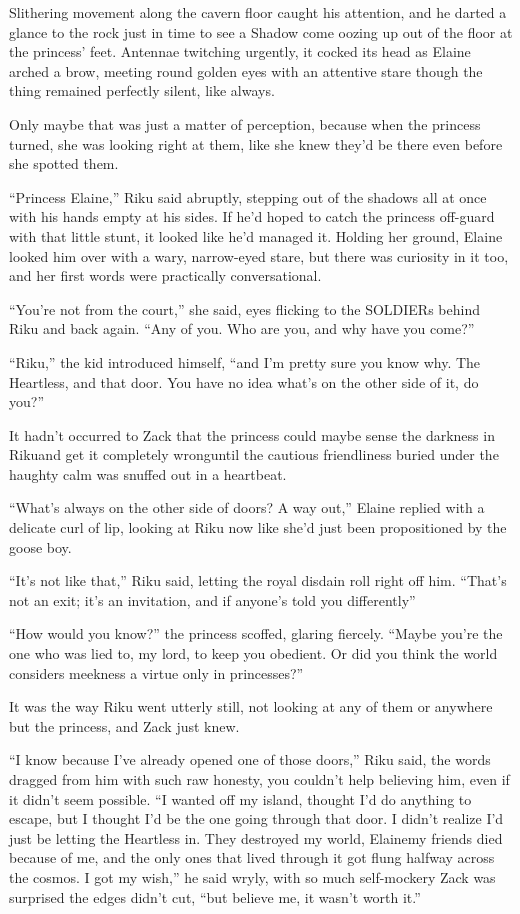 Slithering movement along the cavern floor caught his attention, and he darted a glance to the rock just in time to see a Shadow come oozing up out of the floor at the princess' feet. Antennae twitching urgently, it cocked its head as Elaine arched a brow, meeting round golden eyes with an attentive stare though the thing remained perfectly silent, like always.

Only maybe that was just a matter of perception, because when the princess turned, she was looking right at them, like she knew they'd be there even before she spotted them.

``Princess Elaine,'' Riku said abruptly, stepping out of the shadows all at once with his hands empty at his sides. If he'd hoped to catch the princess off-guard with that little stunt, it looked like he'd managed it. Holding her ground, Elaine looked him over with a wary, narrow-eyed stare, but there was curiosity in it too, and her first words were practically conversational.

``You're not from the court,'' she said, eyes flicking to the SOLDIERs behind Riku and back again. ``Any of you. Who are you, and why have you come?''

``Riku,'' the kid introduced himself, ``and I'm pretty sure you know why. The Heartless, and that door. You have no idea what's on the other side of it, do you?''

It hadn't occurred to Zack that the princess could maybe sense the darkness in Riku\textemdash and get it completely wrong\textemdash until the cautious friendliness buried under the haughty calm was snuffed out in a heartbeat.

``What's always on the other side of doors? A way out,'' Elaine replied with a delicate curl of lip, looking at Riku now like she'd just been propositioned by the goose boy.

``It's not like that,'' Riku said, letting the royal disdain roll right off him. ``That's not an exit; it's an invitation, and if anyone's told you differently\textemdash ''

``How would you know?'' the princess scoffed, glaring fiercely. ``Maybe you're the one who was lied to, my lord, to keep you obedient. Or did you think the world considers meekness a virtue only in princesses?''

It was the way Riku went utterly still, not looking at any of them or anywhere but the princess, and Zack just knew.

``I know because I've already opened one of those doors,'' Riku said, the words dragged from him with such raw honesty, you couldn't help believing him, even if it didn't seem possible. ``I wanted off my island, thought I'd do anything to escape, but I thought I'd be the one going through that door. I didn't realize I'd just be letting the Heartless in. They destroyed my world, Elaine\textemdash my friends died because of me, and the only ones that lived through it got flung halfway across the cosmos. I got my wish,'' he said wryly, with so much self-mockery Zack was surprised the edges didn't cut, ``but believe me, it wasn't worth it.''

